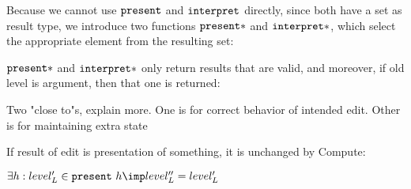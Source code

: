 Because we cannot use ${\tt present}$ and ${\tt interpret}$ directly, since both have a set as result type, we introduce two functions ${\tt present}*$ and ${\tt interpret}*$, which select the appropriate element from the resulting set:



${\tt present}*$ and ${\tt interpret}*$ only return results that are valid, and moreover, if old level is argument, then that one is returned: 


\bl
\* Two "close to"s, explain more. One is for correct behavior of intended edit. Other is for maintaining extra state
\el

If result of edit is presentation of something, it is unchanged by {\sc Compute}: 

$\exists h : level'_L \in \present~h \imp level''_L = level'_L$


